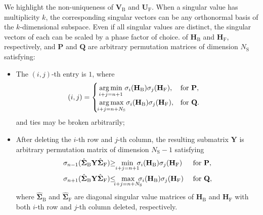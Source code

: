 \documentclass[
	fontsize=11pt,
	paper=a4,
	foldmarks=false
]{scrartcl}
\begin{document}
\begin{reviewer}
{{\begin{corollary}
{					We highlight the non-uniqueness of $\mathbf{V}_\mathrm{B}$ and $\mathbf{U}_\mathrm{F}$. When a singular value has multiplicity $k$, the corresponding singular vectors can be any orthonormal basis of the $k$-dimensional subspace. Even if all singular values are distinct, the singular vectors of each can be scaled by a phase factor of choice.} of $\mathbf{H}_\mathrm{B}$ and $\mathbf{H}_\mathrm{F}$, respectively,
				and $\mathbf{P}$ and $\mathbf{Q}$ are arbitrary permutation matrices of dimension $N_\mathrm{S}$ satisfying:
				\begin{itemize}
					\item The $(i, j)$-th entry is $1$, where
					\begin{align*}
						(i, j) &=
						\begin{cases}
							\underset{\mathclap{i+j=n+1}}{\arg\min} \ \sigma_i(\mathbf{H}_\mathrm{B}) \sigma_j(\mathbf{H}_\mathrm{F}), & \text{for } \mathbf{P}, \\
							\underset{\mathclap{i+j=n+N_\mathrm{S}}}{\arg\max} \ \sigma_i(\mathbf{H}_\mathrm{B}) \sigma_j(\mathbf{H}_\mathrm{F}), & \text{for } \mathbf{Q}.
						\end{cases}
					\end{align*}
					and ties may be broken arbitrarily;
					\item After deleting the $i$-th row and $j$-th column, the resulting submatrix $\mathbf{Y}$ is arbitrary permutation matrix of dimension $N_\mathrm{S}-1$ satisfying
					\begin{alignat*}{2}
						\sigma_{n{-}1}(\hat{\mathbf{\Sigma}}_{\mathrm{B}} \mathbf{Y} \hat{\mathbf{\Sigma}}_{\mathrm{F}}) & {\ge} \ \ \min_{\mathclap{i+j=n+1}} \ \sigma_i(\mathbf{H}_\mathrm{B}) \sigma_j(\mathbf{H}_\mathrm{F})            &  & \text{ for } \mathbf{P}, \\
						\sigma_{n{+}1}(\hat{\mathbf{\Sigma}}_{\mathrm{B}} \mathbf{Y} \hat{\mathbf{\Sigma}}_{\mathrm{F}}) & {\le} \ \ \max_{\mathclap{i+j=n+N_\mathrm{S}}} \ \sigma_i(\mathbf{H}_\mathrm{B}) \sigma_j(\mathbf{H}_\mathrm{F}) &  & \text{ for } \mathbf{Q},
					\end{alignat*}
					where $\hat{\mathbf{\Sigma}}_{\mathrm{B}}$ and $\hat{\mathbf{\Sigma}}_{\mathrm{F}}$ are diagonal singular value matrices of $\mathbf{H}_\mathrm{B}$ and $\mathbf{H}_\mathrm{F}$ with both $i$-th row and $j$-th column deleted, respectively.
				\end{itemize}
			\end{corollary}
		}

}
\end{reviewer}
\end{document}
